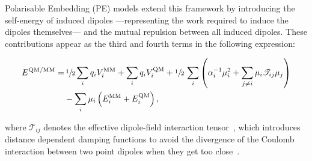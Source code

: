 Polarisable Embedding (PE) models extend this framework by introducing the
self-energy of induced dipoles ---representing the work required to induce the
dipoles themselves--- and the mutual repulsion between all induced dipoles. These
contributions appear as the third and fourth terms in the following expression:

\begin{align}
  E^\text{QM/MM} =&\, \sfrac{1}{2}\sum_iq_iV_i^\text{MM} + \sum_iq_iV_i^\text{QM}
    + \sfrac{1}{2}\,\sum_i \left(\alpha_i^{-1}\mu_i^2 +
      \sum_{j\neq i}\mu_i\mathscr{T}_{ij}\mu_j\right) \nonumber\\
    &- \sum_i\mu_i \left(E_i^\text{MM} + E_i^\text{QM}\right),
\end{align}

\noindent where $\mathscr{T}_{ij}$ denotes the effective dipole-field
interaction tensor~\cite{Lipparini2014, Bondanza2020}, which introduces
distance dependent damping functions to avoid the divergence of the Coulomb
interaction between two point dipoles when they get too
close~\cite{Ponder2003}.

